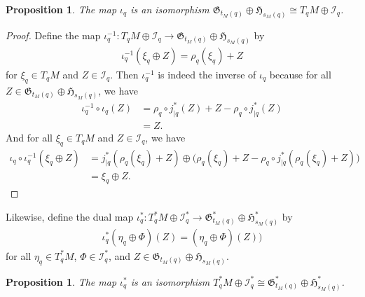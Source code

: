 \documentclass[sn-mathphys,Numbered]{sn-jnl}
\newtheorem{proposition}[theorem]{Proposition}%
\begin{document}
\begin{proposition}
    The map $\iota_q$ is an isomorphism $\mathfrak{G}_{t_M(q)}\oplus\mathfrak{H}_{s_M(q)}\cong T_qM\oplus\mathcal{I}_q$.
\end{proposition}
\begin{proof}
    Define the map $\iota_q^{-1}: T_qM\oplus \mathcal{I}_q\to \mathfrak{G}_{t_M(q)}\oplus\mathfrak{H}_{s_M(q)}$ by
    \begin{align}
        \iota_q^{-1}(\xi_q\oplus Z) = \rho_q(\xi_q) + Z
    \end{align}
    for $\xi_q\in T_qM$ and $Z\in \mathcal{I}_q$.  Then $\iota_q^{-1}$ is indeed the inverse of $\iota_q$ because for all $Z\in \mathfrak{G}_{t_M(q)}\oplus\mathfrak{H}_{s_M(q)}$, we have
    \begin{align}
        \iota_q^{-1}\circ \iota_q(Z) &= \rho_q\circ j^*_{|q}(Z) + Z - \rho_q\circ j^*_{|q}(Z)\\
        &=Z.
    \end{align}
    And for all $\xi_q\in T_qM$ and $Z\in\mathcal{I}_q$, we have
    \begin{align}
        \iota_q\circ\iota_q^{-1}(\xi_q\oplus Z) &= j^*_{|q}(\rho_q(\xi_q) + Z)\oplus \big(\rho_q(\xi_q)+Z - \rho_q\circ j^*_{|q}(\rho_q(\xi_q)+Z)\big)\\
        &=\xi_q\oplus Z.
    \end{align}
\end{proof}

Likewise, define the dual map $\iota^*_q: T^*_qM\oplus \mathcal{I}_q^*\to \mathfrak{G}^*_{t_M(q)}\oplus\mathfrak{H}^*_{s_M(q)}$ by
\begin{align}
    \iota^*_q(\eta_q\oplus\Phi)(Z) = (\eta_q\oplus\Phi)(Z))
\end{align}
for all $\eta_q\in T^*_qM$, $\Phi\in \mathcal{I}_q^*$, and $Z\in \mathfrak{G}_{t_M(q)}\oplus\mathfrak{H}_{s_M(q)}.$\bigskip

\begin{proposition}
    The map $\iota^*_q$ is an isomorphism $T^*_qM\oplus \mathcal{I}_q^*\cong\mathfrak{G}^*_{t_M(q)}\oplus\mathfrak{H}^*_{s_M(q)}$.
\end{proposition}
\end{document}
